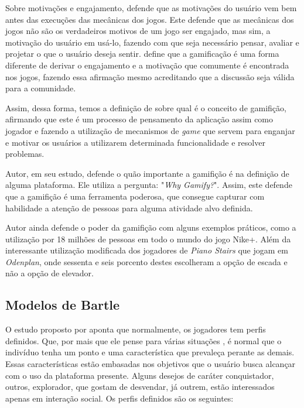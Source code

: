 Sobre motivações e engajamento, \cite{chou2015actionable}  defende que as motivações
do usuário vem bem antes das execuções das mecânicas dos jogos. Este defende
que as mecânicas dos jogos não são os verdadeiros motivos de um jogo ser
engajado, mas sim, a motivação do usuário em usá-lo, fazendo com que seja
necessário pensar, avaliar e projetar o que o usuário deseja sentir. \cite{chou2015actionable} define que a gamificação é uma forma diferente de derivar o engajamento
e a motivação  que comumente é encontrada nos jogos, fazendo essa afirmação
mesmo acreditando que a discussão seja válida para a comunidade.

Assim, dessa forma, temos a definição de \cite{zichermann2011gamification} sobre qual é o conceito de
gamifição, afirmando que este é um processo de pensamento da aplicação assim
como jogador e fazendo a utilização
de mecanismos de \textit{game} que servem para enganjar e motivar os usuários a utilizarem
determinada funcionalidade e resolver problemas.

Autor, em seu estudo, defende o quão importante a gamifição é na definição
de alguma plataforma. Ele utiliza a pergunta: "\textit{Why Gamify?}". Assim, este defende
que a gamifição é uma ferramenta poderosa, que consegue capturar com habilidade
a atenção de pessoas para alguma atividade alvo definida.

Autor ainda defende  o poder da gamifição com alguns exemplos práticos,
como a utilização por 18 milhões de pessoas em todo o mundo do jogo Nike+.
Além da interessante utilização modificada dos jogadores de
\textit{Piano Stairs} que jogam em \textit{Odenplan}, onde sessenta e seis porcento destes
escolheram a opção de escada e não a opção de elevador.

\subsection{Modelos de Bartle}
\label{sub:modeloBartle}
O estudo proposto por \cite{bartle1996hearts} aponta que normalmente, os jogadores
tem perfis definidos. Que, por mais que ele pense para várias situações
, é normal que o indivíduo tenha um ponto e uma característica que prevaleça
perante as demais. Essas características estão embasadas nos objetivos
que o usuário  busca alcançar com o uso da plataforma presente.
Alguns desejos de caráter conquistador, outros, explorador, que gostam
de desvendar, já outrem, estão interessados apenas em interação
social. Os perfis definidos são os seguintes:


